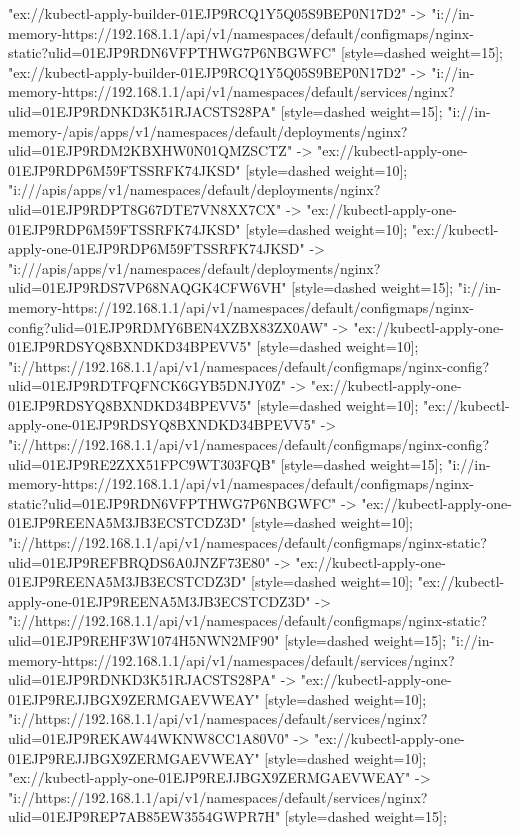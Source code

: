{"ex://kubectl-apply-builder-01EJP9RCQ1Y5Q05S9BEP0N17D2" -> "i://in-memory-https://192.168.1.1/api/v1/namespaces/default/configmaps/nginx-static?ulid=01EJP9RDN6VFPTHWG7P6NBGWFC" [style=dashed weight=15];
"ex://kubectl-apply-builder-01EJP9RCQ1Y5Q05S9BEP0N17D2" -> "i://in-memory-https://192.168.1.1/api/v1/namespaces/default/services/nginx?ulid=01EJP9RDNKD3K51RJACSTS28PA" [style=dashed weight=15];
"i://in-memory-/apis/apps/v1/namespaces/default/deployments/nginx?ulid=01EJP9RDM2KBXHW0N01QMZSCTZ" -> "ex://kubectl-apply-one-01EJP9RDP6M59FTSSRFK74JKSD" [style=dashed weight=10];
"i:///apis/apps/v1/namespaces/default/deployments/nginx?ulid=01EJP9RDPT8G67DTE7VN8XX7CX" -> "ex://kubectl-apply-one-01EJP9RDP6M59FTSSRFK74JKSD" [style=dashed weight=10];
"ex://kubectl-apply-one-01EJP9RDP6M59FTSSRFK74JKSD" -> "i:///apis/apps/v1/namespaces/default/deployments/nginx?ulid=01EJP9RDS7VP68NAQGK4CFW6VH" [style=dashed weight=15];
"i://in-memory-https://192.168.1.1/api/v1/namespaces/default/configmaps/nginx-config?ulid=01EJP9RDMY6BEN4XZBX83ZX0AW" -> "ex://kubectl-apply-one-01EJP9RDSYQ8BXNDKD34BPEVV5" [style=dashed weight=10];
"i://https://192.168.1.1/api/v1/namespaces/default/configmaps/nginx-config?ulid=01EJP9RDTFQFNCK6GYB5DNJY0Z" -> "ex://kubectl-apply-one-01EJP9RDSYQ8BXNDKD34BPEVV5" [style=dashed weight=10];
"ex://kubectl-apply-one-01EJP9RDSYQ8BXNDKD34BPEVV5" -> "i://https://192.168.1.1/api/v1/namespaces/default/configmaps/nginx-config?ulid=01EJP9RE2ZXX51FPC9WT303FQB" [style=dashed weight=15];
"i://in-memory-https://192.168.1.1/api/v1/namespaces/default/configmaps/nginx-static?ulid=01EJP9RDN6VFPTHWG7P6NBGWFC" -> "ex://kubectl-apply-one-01EJP9REENA5M3JB3ECSTCDZ3D" [style=dashed weight=10];
"i://https://192.168.1.1/api/v1/namespaces/default/configmaps/nginx-static?ulid=01EJP9REFBRQDS6A0JNZF73E80" -> "ex://kubectl-apply-one-01EJP9REENA5M3JB3ECSTCDZ3D" [style=dashed weight=10];
"ex://kubectl-apply-one-01EJP9REENA5M3JB3ECSTCDZ3D" -> "i://https://192.168.1.1/api/v1/namespaces/default/configmaps/nginx-static?ulid=01EJP9REHF3W1074H5NWN2MF90" [style=dashed weight=15];
"i://in-memory-https://192.168.1.1/api/v1/namespaces/default/services/nginx?ulid=01EJP9RDNKD3K51RJACSTS28PA" -> "ex://kubectl-apply-one-01EJP9REJJBGX9ZERMGAEVWEAY" [style=dashed weight=10];
"i://https://192.168.1.1/api/v1/namespaces/default/services/nginx?ulid=01EJP9REKAW44WKNW8CC1A80V0" -> "ex://kubectl-apply-one-01EJP9REJJBGX9ZERMGAEVWEAY" [style=dashed weight=10];
"ex://kubectl-apply-one-01EJP9REJJBGX9ZERMGAEVWEAY" -> "i://https://192.168.1.1/api/v1/namespaces/default/services/nginx?ulid=01EJP9REP7AB85EW3554GWPR7H" [style=dashed weight=15];
}

